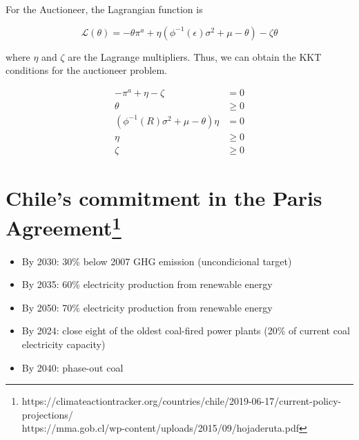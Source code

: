 \documentclass[11pt, letterpaper]{article}
\begin{document}
For the Auctioneer, the Lagrangian function is 

\begin{equation}
    \mathcal{L}(\theta)= -\theta \pi^{a} + \eta (\phi^{-1}(\epsilon) \sigma^2 + \mu - \theta) - \zeta \theta
\end{equation}

where $\eta$ and $\zeta$ are the Lagrange multipliers. Thus, we can obtain the KKT conditions for the auctioneer problem.

\begin{align}
    -\pi^{a} +\eta -\zeta & = 0 \\
    \theta & \geq  0 \\
    (\phi^{-1}(R) \sigma^2 + \mu - \theta) \eta & =  0\\
    \eta & \geq  0\\
    \zeta & \geq 0
\end{align}

\section{Chile's commitment in the Paris Agreement\footnote{https://climateactiontracker.org/countries/chile/2019-06-17/current-policy-projections/ \\https://mma.gob.cl/wp-content/uploads/2015/09/hojaderuta.pdf} }

\begin{itemize}
    \item By 2030: 30\% below 2007 GHG emission (uncondicional target)
    \item By 2035: 60\% electricity production from renewable energy 
    \item By 2050: 70\% electricity production from renewable energy
    \item By 2024: close eight of the oldest coal-fired power plants (20\% of current coal electricity capacity) 
    \item By 2040: phase-out coal 
\end{itemize}
\end{document}
